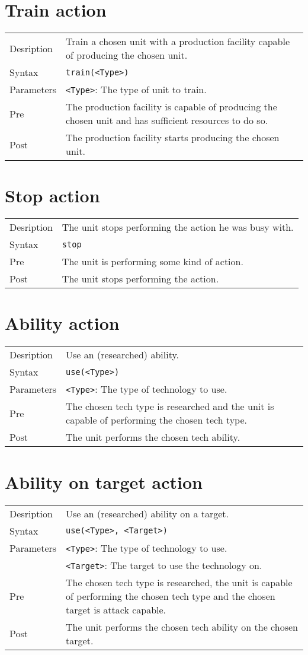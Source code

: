 \section{Train action}
\begin{tabularx}{\textwidth}{lX}
 Desription & Train a chosen unit with a production facility capable of producing the chosen unit. \\
 Syntax & \verb|train(<Type>)| \\
 Parameters & \verb|<Type>|: The type of unit to train.\\
 Pre & The production facility is capable of producing the chosen unit and has sufficient resources to do so. \\
 Post & The production facility starts producing the chosen unit.
\end{tabularx}

\section{Stop action}
\begin{tabularx}{\textwidth}{lX}
 Desription & The unit stops performing the action he was busy with. \\
 Syntax & \verb|stop| \\
 Pre & The unit is performing some kind of action. \\
 Post & The unit stops performing the action.
\end{tabularx}

\section{Ability action}
\begin{tabularx}{\textwidth}{lX}
 Desription & Use an (researched) ability. \\
 Syntax & \verb|use(<Type>)| \\
 Parameters & \verb|<Type>|: The type of technology to use.\\
 Pre & The chosen tech type is researched and the unit is capable of performing the chosen tech type. \\
 Post & The unit performs the chosen tech ability.
\end{tabularx}

\section{Ability on target action}
\begin{tabularx}{\textwidth}{lX}
 Desription & Use an (researched) ability on a target. \\
 Syntax & \verb|use(<Type>, <Target>)| \\
 Parameters & \verb|<Type>|: The type of technology to use.\\
            & \verb|<Target>|: The target to use the technology on.\\
 Pre & The chosen tech type is researched, the unit is capable of performing the chosen tech type and the chosen target is attack capable. \\
 Post & The unit performs the chosen tech ability on the chosen target.
\end{tabularx}

